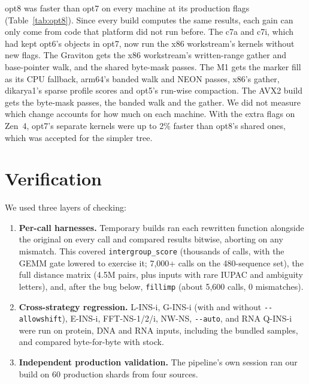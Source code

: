 \documentclass[11pt]{article}
\newcommand{\code}[1]{\texttt{#1}}
\begin{document}
opt8 was faster than opt7 on every machine at its production flags (Table~\ref{tab:opt8}). Since
every build computes the same results, each gain can only come from code that platform did not
run before. The c7a and c7i, which had kept
opt6's objects in opt7, now run the x86 workstream's kernels without new flags. The Graviton gets
the x86 workstream's written-range gather and base-pointer walk, and the shared byte-mask
passes. The M1 gets the marker fill as
its CPU fallback, arm64's banded walk and NEON passes, x86's gather, dikarya1's sparse profile
scores and opt5's run-wise compaction. The AVX2 build gets the byte-mask passes, the banded walk
and the gather. We did not measure which change accounts for how much on each machine. With the
extra flags on Zen~4, opt7's separate kernels were up to 2\% faster than opt8's shared ones,
which was accepted for the simpler tree.

\section{Verification}
\label{sec:verify}

We used three layers of checking:
\begin{enumerate}
\item \textbf{Per-call harnesses.} Temporary builds ran each rewritten function alongside
  the original on every call and compared results bitwise, aborting on any mismatch. This
  covered \code{intergroup\_score} (thousands of calls, with the GEMM gate lowered to
  exercise it; 7{,}000+ calls on the 480-sequence set), the full distance matrix
  (4.5M pairs, plus inputs with rare IUPAC and ambiguity letters), and, after the bug
  below, \code{fillimp} (about 5{,}600 calls, 0 mismatches).
\item \textbf{Cross-strategy regression.} L-INS-i, G-INS-i (with and without
  \code{-{}-allowshift}), E-INS-i, FFT-NS-1/2/i, NW-NS, \code{-{}-auto}, and RNA Q-INS-i were
  run on protein, DNA and RNA inputs, including the bundled samples, and compared
  byte-for-byte with stock.
\item \textbf{Independent production validation.} The pipeline's own session ran our build
  on 60 production shards from four sources.
\end{enumerate}
\end{document}
